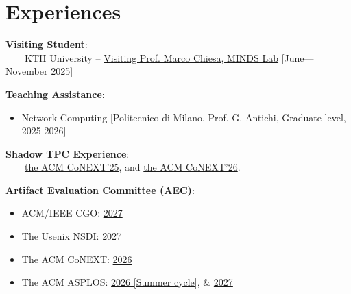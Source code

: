 \section{Experiences}

\noindent\textbf{\large{}Visiting Student}: \\
~~~~KTH University -- \href{https://www.kth.se/blogs/minds/}{Visiting Prof. Marco Chiesa, MINDS Lab} [June---November 2025]

\vspace{3mm}\noindent\textbf{\large{}Teaching Assistance}: \\

\begin{itemize}
  \vspace{-3mm}
    \item Network Computing [{\small{}Politecnico di Milano, Prof. G. Antichi, Graduate level, 2025-2026}]
  \vspace{-3mm}
\end{itemize}

\vspace{3mm}\noindent\textbf{\large{}Shadow TPC Experience}: \\
~~~~\href{https://shadowconext25winter.hotcrp.com/users/pc}{the ACM CoNEXT'25}, and
\href{https://conext26shadow.hotcrp.com/users/pc}{the ACM CoNEXT'26}.

\vspace{3mm}\noindent\textbf{\large{}Artifact Evaluation Committee (AEC)}: \\
\begin{itemize}
  \vspace{-3mm}
  \item ACM/IEEE CGO:
      \href{https://cgo27ae.hotcrp.com/users/pc}{2027} \vspace{-2mm}
  \item The Usenix NSDI:
      \href{https://nsdi27springae.usenix.hotcrp.com/users/pc}{2027} \vspace{-2mm}
  \item The ACM CoNEXT:
      \href{https://conext26artifacts.hotcrp.com/users/pc}{2026} \vspace{-2mm}
  \item The ACM ASPLOS:
      \href{https://sites.google.com/view/asplos26aec/committee}{2026 [Summer cycle]}, \&
      \href{https://asplos27ae-summer.hotcrp.com/users/pc}{2027}
\end{itemize}
